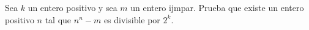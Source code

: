 Sea $k$ un entero positivo y sea $m$ un entero ijmpar. Prueba que existe un entero positivo $n$ tal que $n^n-m$ es divisible por $2^k$.